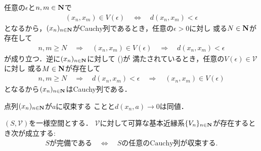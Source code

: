 	\begin{prf}
		任意の$\epsilon$と$n,m \in \mathbf{N}$で
		\begin{align}
			(x_n,x_m) \in V(\epsilon) \quad \Longleftrightarrow \quad
			d(x_n,x_m) < \epsilon
		\end{align}
		となるから，$(x_n)_{n \in \mathbf{N}}$がCauchy列であるとき，任意の$\epsilon > 0$に対し
		或る$N \in \mathbf{N}$が存在して
		\begin{align}
			n,m \geq N \quad \Longrightarrow \quad
			(x_n,x_m) \in V(\epsilon) \quad \Longrightarrow \quad
			d(x_n,x_m) < \epsilon
		\end{align}
		が成り立つ．逆に$(x_n)_{n \in \mathbf{N}}$に対して
		()が
		満たされているとき，任意の$V(\epsilon) \in \mathscr{V}$に対し
		或る$M \in \mathbf{N}$が存在して
		\begin{align}
			n,m \geq N \quad \Longrightarrow \quad
			d(x_n,x_m) < \epsilon \quad \Longrightarrow \quad
			(x_n,x_m) \in V(\epsilon)
		\end{align}
		となるから$(x_n)_{n \in \mathbf{N}}$はCauchy列である．
		\QED
	\end{prf}
	
	\begin{screen}
		\begin{thm}[点列の擬距離に関する収束]
			点列$(x_n)_{n \in \mathbf{N}}$が$a$に収束する
			ことと$d(x_n,a) \longrightarrow 0$は同値．
		\end{thm}
	\end{screen}
	
	\begin{screen}
		\begin{thm}
		\label{thm:complete_iff_every_Cauchy_seq_converges_if_entourage_contains_some_countable_subset}
			$(S,\mathscr{V})$を一様空間とする．
			$\mathscr{V}$に対して可算な基本近縁系$\{V_n\}_{n \in \mathbf{N}}$が存在するとき次が成立する:
			\begin{align}
				\mbox{$S$が完備である} \quad \Longleftrightarrow \quad
				\mbox{$S$の任意のCauchy列が収束する}.
			\end{align}
		\end{thm}
	\end{screen}
	
